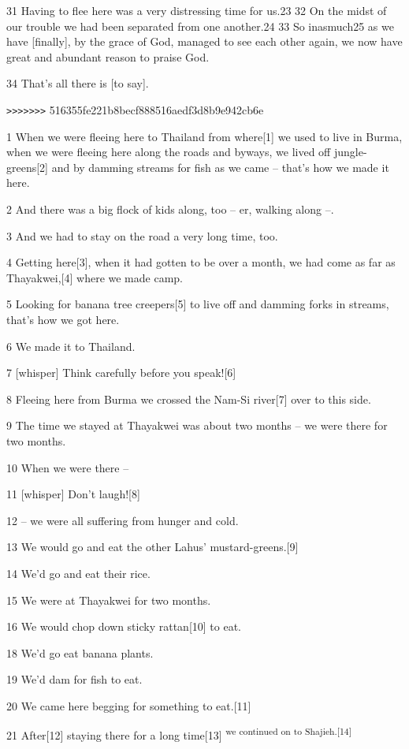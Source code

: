 {31 Having to flee here was a very distressing time for us.23 32 On the
midst of our trouble we had been separated from one another.24 33 So inasmuch25
as we have [finally], by the grace of God, managed to see each other again, we
now have great and abundant reason to praise God. }

{34 That's all there is [to say].}

{\texttt{>}\texttt{>}\texttt{>}\texttt{>}\texttt{>}\texttt{>}\texttt{>}
516355fe221b8becf888516aedf3d8b9e942cb6e}

{1 When we were fleeing here to Thailand from where[1] we used to live in
Burma, when we were fleeing here along the roads and byways, we lived off jungle-greens[2]
and by damming streams for fish as we came -- that's how we made it here. }

{2 And there was a big flock of kids along, too -- er, walking along --.
}

{3 And we had to stay on the road a very long time, too. }

{4 Getting here[3], when it had gotten to be over a month, we had come as
far as Thayakwei,[4] where we made camp.}

{5 Looking for banana tree creepers[5] to live off and damming forks in
streams, that's how we got here. }

{6 We made it to Thailand.}

{7 [whisper] Think carefully before you speak![6]}

{8 Fleeing here from Burma we crossed the Nam-Si river[7] over to this side.
}

{9 The time we stayed at Thayakwei was about two months -- we were there
for two months. }

{10 When we were there --}

{11 [whisper] Don't laugh![8]}

{12 -- we were all suffering from hunger and cold. }

{13 We would go and eat the other Lahus' mustard-greens.[9]}

{14 We'd go and eat their rice. }

{15 We were at Thayakwei for two months. }

{16 We would chop down sticky rattan[10] to eat. }

{18 We'd go eat banana plants. }

{19 We'd dam for fish to eat. }

{20 We came here begging for something to eat.[11]}

{21 After[12] staying there for a long time[13]}{\textsuperscript{
we continued on to Shajieh.[14] }}

